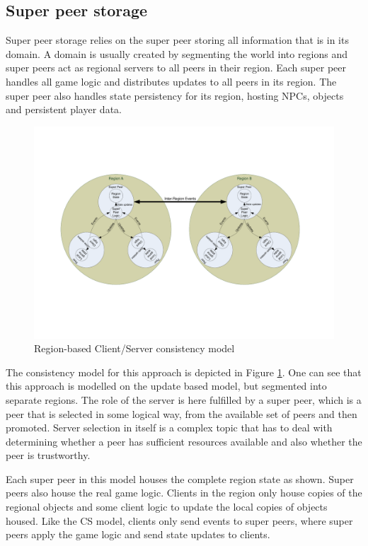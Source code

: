 \documentclass[10pt,a4paper,journal,cspaper,compsoc]{IEEEtran}
\begin{document}
\subsection{Super peer storage}
\label{super_peer_storage}

Super peer storage relies on the super peer storing all information that is in its domain. A domain is usually created by segmenting the world into
regions and super peers act as regional servers to all peers in their region. Each super peer handles all game logic and distributes updates to all
peers in its region. The super peer also handles state persistency for its region, hosting NPCs, objects and persistent player data.

\begin{figure}[htbp]
 \centering
 \includegraphics[clip=true, viewport=2cm 5cm 27cm 16.5cm, width=\textwidth]{region_based_CS_CM}
 \caption{Region-based Client/Server consistency model}
 \label{fig_cs_region_cm}
\end{figure}
%
The consistency model for this approach is depicted in Figure \ref{fig_cs_region_cm}. One can see that this approach is modelled on the update based
model, but segmented into separate regions. The role of the server is here fulfilled by a super peer, which is a peer that is selected in some
logical way, from the available set of peers and then promoted. Server selection in itself is a complex topic that has to deal with determining
whether a peer has sufficient resources available and also whether the peer is trustworthy.

Each super peer in this model houses the complete region state as shown. Super peers also house the real game logic. Clients in the region only house
copies of the regional objects and some client logic to update the local copies of objects housed. Like the \ac{CS} model, clients only send events
to super peers, where super peers apply the game logic and send state updates to clients.
\end{document}
